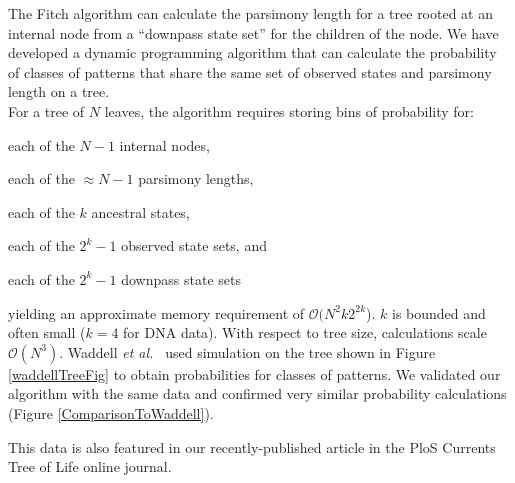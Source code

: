 \documentclass[a0paper,landscape]{baposter}
\begin{document}
\begin{poster}
{The Fitch algorithm can calculate the parsimony length for a tree rooted at an internal node from a ``downpass state set'' for the children of the node.
We have developed a dynamic programming algorithm that can calculate the probability of classes of patterns that share the same set of observed states and parsimony length on a tree.\\
For a tree of $N$ leaves, the algorithm requires storing bins of probability for:
\begin{compactitem}
	\item each of the $N-1$ internal nodes,
	\item each of the $\approx N - 1$ parsimony lengths,
	\item each of the $k$ ancestral states,
	\item  each of the $2^{k}-1$ observed state sets, and
	\item each of the $2^{k}-1$ downpass state sets
\end{compactitem}
yielding an approximate memory requirement of $\mathcal{O}(N^2 k 2^{2k}$).
$k$ is bounded and often small ($k=4$ for DNA data).
With respect to tree size, calculations scale $\mathcal{O}(N^3).$
Waddell {\em et al.~}\citep{WaddellOP2009} used simulation on the tree shown in Figure \ref{waddellTreeFig} to obtain probabilities for classes of patterns.
We validated our algorithm with the same data and confirmed very similar probability calculations (Figure \ref{ComparisonToWaddell}).  

This data is also featured in our recently-published article in the PloS Currents Tree of Life online journal.


}
\end{poster}
\end{document}
